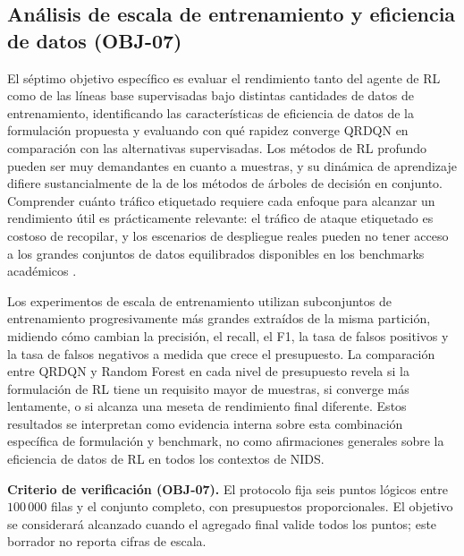 \subsection{Análisis de escala de entrenamiento y eficiencia de datos (OBJ-07)}
El séptimo objetivo específico es evaluar el rendimiento tanto del agente de RL como de las líneas base supervisadas bajo distintas cantidades de datos de entrenamiento, identificando las características de eficiencia de datos de la formulación propuesta y evaluando con qué rapidez converge QRDQN en comparación con las alternativas supervisadas. Los métodos de RL profundo pueden ser muy demandantes en cuanto a muestras, y su dinámica de aprendizaje difiere sustancialmente de la de los métodos de árboles de decisión en conjunto. Comprender cuánto tráfico etiquetado requiere cada enfoque para alcanzar un rendimiento útil es prácticamente relevante: el tráfico de ataque etiquetado es costoso de recopilar, y los escenarios de despliegue reales pueden no tener acceso a los grandes conjuntos de datos equilibrados disponibles en los benchmarks académicos \parencite{Ring2019DatasetSurvey}.

Los experimentos de escala de entrenamiento utilizan subconjuntos de entrenamiento progresivamente más grandes extraídos de la misma partición, midiendo cómo cambian la precisión, el recall, el F1, la tasa de falsos positivos y la tasa de falsos negativos a medida que crece el presupuesto. La comparación entre QRDQN y Random Forest en cada nivel de presupuesto revela si la formulación de RL tiene un requisito mayor de muestras, si converge más lentamente, o si alcanza una meseta de rendimiento final diferente. Estos resultados se interpretan como evidencia interna sobre esta combinación específica de formulación y benchmark, no como afirmaciones generales sobre la eficiencia de datos de RL en todos los contextos de NIDS.

\textbf{Criterio de verificación (OBJ-07).} El protocolo fija seis puntos lógicos entre $100\,000$ filas y el conjunto completo, con presupuestos proporcionales. El objetivo se considerará alcanzado cuando el agregado final valide todos los puntos; este borrador no reporta cifras de escala.


